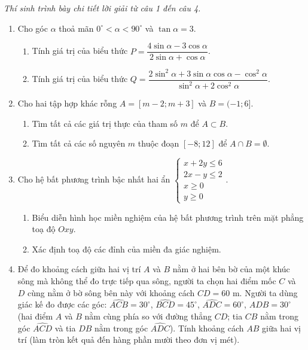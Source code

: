 \documentclass[12pt,a4paper]{article}
\newcommand{\parttitle}[1]{\par\vspace{1.5pt}\needspace{2\baselineskip}{\large\bfseries\color{ink}#1}\par\nopagebreak\vspace{1pt}}
\begin{document}
\parttitle{PHẦN IV. Tự luận}
\textit{Thí sinh trình bày chi tiết lời giải từ câu 1 đến câu 4.}
\begin{enumerate}
\item Cho góc $\alpha$ thoả mãn $0^\circ < \alpha < 90^\circ$ và $\tan \alpha = 3$.
\begin{enumerate}
    \item Tính giá trị của biểu thức $P = \dfrac{4\sin \alpha - 3\cos \alpha}{2\sin \alpha + \cos \alpha}$.
    \item Tính giá trị của biểu thức $Q = \dfrac{2\sin^2 \alpha + 3\sin \alpha \cos \alpha - \cos^2 \alpha}{\sin^2 \alpha + 2\cos^2 \alpha}$.
\end{enumerate}

\item Cho hai tập hợp khác rỗng $A = [m - 2; m + 3]$ và $B = (-1; 6]$.
\begin{enumerate}
    \item Tìm tất cả các giá trị thực của tham số $m$ để $A \subset B$.
    \item Tìm tất cả các số nguyên $m$ thuộc đoạn $[-8; 12]$ để $A \cap B = \emptyset$.
\end{enumerate}

\item Cho hệ bất phương trình bậc nhất hai ẩn $\begin{cases} x + 2y \le 6 \\ 2x - y \le 2 \\ x \ge 0 \\ y \ge 0 \end{cases}$.
\begin{enumerate}
    \item Biểu diễn hình học miền nghiệm của hệ bất phương trình trên mặt phẳng toạ độ $Oxy$.
    \item Xác định toạ độ các đỉnh của miền đa giác nghiệm.
\end{enumerate}

\item Để đo khoảng cách giữa hai vị trí $A$ và $B$ nằm ở hai bên bờ của một khúc sông mà không thể đo trực tiếp qua sông, người ta chọn hai điểm mốc $C$ và $D$ cùng nằm ở bờ sông bên này với khoảng cách $CD = 60\text{ m}$. Người ta dùng giác kế đo được các góc: $\widehat{ACB} = 30^\circ$, $\widehat{BCD} = 45^\circ$, $\widehat{ADC} = 60^\circ$, $\widehat{ADB} = 30^\circ$ (hai điểm $A$ và $B$ nằm cùng phía so với đường thẳng $CD$; tia $CB$ nằm trong góc $\widehat{ACD}$ và tia $DB$ nằm trong góc $\widehat{ADC}$). Tính khoảng cách $AB$ giữa hai vị trí (làm tròn kết quả đến hàng phần mười theo đơn vị mét).
\end{enumerate}
\end{document}
